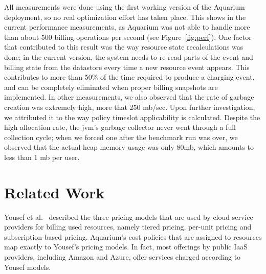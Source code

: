 \documentclass[letterpaper,twocolumn,10pt]{article}
\begin{document}
All measurements were done using the first working version of the
Aquarium deployment, so no real optimization effort has taken place.
This shows in the current performance measurements, as Aquarium was
not able to handle more than about 500 billing operations per second
(see Figure~\ref{fig:perf}). One factor that contributed to this result
was the way resource state recalculations was done; in the current
version, the system needs to re-read parts of the event and billing
state from the datastore every time a new resource event appears. This
contributes to more than 50\% of the time required to produce a
charging event, and can be completely eliminated when proper billing
snapshots are implemented. In other measurements, we also observed
that the rate of garbage creation was extremely high, more that 250
{\sc mb}/sec. Upon further investigation, we attributed it to the way
policy timeslot applicability is calculated. Despite the high
allocation rate, the {\sc jvm}'s garbage collector never went through
a full collection cycle; when we forced one after the benchmark run
was over, we observed that the actual heap memory usage was only
80{\sc mb}, which amounts to less than 1 {\sc mb} per user.


\section{Related Work}

Yousef et al.~\cite{Youse08} described the three pricing models that
are used by cloud service providers for billing used resources, namely
tiered pricing, per-unit pricing and subscription-based pricing.
Aquarium's cost policies that are assigned to resources map exactly to
Yousef's pricing models. In fact, most offerings by public IaaS
providers, including Amazon and Azure, offer services charged
according to Yousef models.
\end{document}
